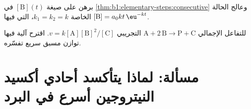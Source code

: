 \begin{exercise}[$\star\star\star$]\label{exo:b1:elementary-steps:11}
برهن على صيغة $[\mathrm{B}](t)$ في
\cref{thm:b1:elementary-steps:consecutive} وعالج الحالة الخاصة
$k_1 = k_2 = k$، التي فيها $[\mathrm{B}] = a_0kt\,\eu^{-kt}$.
\end{exercise}

\begin{exercise}[$\star\star\star$]\label{exo:b1:elementary-steps:12}
للتفاعل الإجمالي $\mathrm{A} + 2\,\mathrm{B} \to \mathrm{P} +
\mathrm{C}$  التجريبي $v =
k[\mathrm{A}][\mathrm{B}]^2/[\mathrm{C}]$. اقترح آلية فيها توازن مسبق
سريع تفسّره.
\end{exercise}

\section{مسألة: لماذا يتأكسد أحادي أكسيد النيتروجين أسرع في البرد}


